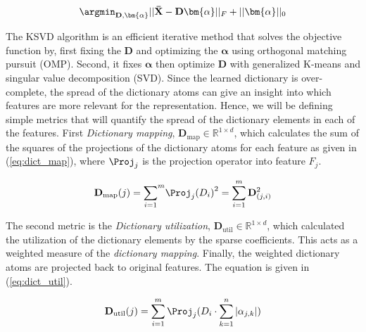 \begin{equation}
    \label{eq:sparse}
    \argmin_{\mathbf{D},\bm{\alpha}} ||\mathbf{\bar{X}}- \mathbf{D}\bm{\alpha}||_F + ||\bm{\alpha}||_0
\end{equation}

The KSVD algorithm is an efficient iterative method that solves the objective function by, first fixing the $\mathbf{D}$ and optimizing the $\bm{\alpha}$ using orthogonal matching pursuit (OMP)\cite{Pati1993}. Second, it fixes $\bm{\alpha}$ then optimize $\mathbf{D}$ with generalized K-means and singular value decomposition (SVD). Since the learned dictionary is over-complete, the spread of the dictionary atoms can give an insight into which features are more relevant for the representation. Hence, we will be defining simple metrics that will quantify the spread of the dictionary elements in each of the features. First \textit{Dictionary mapping}, $\mathbf{D}_\textrm{map} \in \mathbb{R}^{1 \times d}$, which calculates the sum of the squares of the projections of the dictionary atoms for each feature as given in (\ref{eq:dict_map}), where $\Proj_j$ is the projection operator into feature $F_j$. 

\begin{equation}
    \label{eq:dict_map}
    \mathbf{D}_\textrm{map}(j)= {\sum_{i=1}}^m {\Proj_j(D_i)}^2  = \sum_{i=1}^m \mathbf{D}_{(j,i)}^2 
\end{equation}

 The second metric is the \textit{Dictionary utilization}, $\mathbf{D}_\textrm{util} \in \mathbb{R}^{1 \times d}$, which calculated the utilization of the dictionary elements by the sparse coefficients. This acts as a weighted measure of the \textit{dictionary mapping}. Finally, the weighted dictionary atoms are projected back to original features. The equation is given in (\ref{eq:dict_util}).
 
 \begin{equation}
    \label{eq:dict_util}
    \mathbf{D}_\textrm{util}(j)= \sum_{i=1}^m \Proj_j(D_i \cdot \sum_{k=1}^n |\alpha_{j,k}|)  
\end{equation}
 
